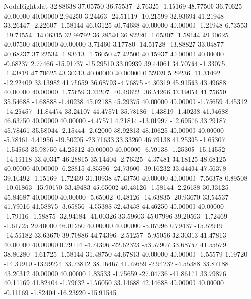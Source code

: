 \begin{filecontents}{NodeRight.dat}
  32.88638   37.05750   36.75537    -2.76325   -1.15169   48.77500   36.70625   40.00000   40.00000    2.94250    3.24463  -24.51119  -10.21599
  32.93694   41.21948   33.26447    -2.22607   -1.58144   46.03125   40.74688   40.00000   40.00000   -1.21948    6.73553  -19.79554  -14.06315
  32.99792   36.28540   36.82220    -1.65307   -1.58144   49.60625   40.07500   40.00000   40.00000    3.71460    3.17780  -14.51728  -13.88827
  33.04877   40.68237   37.22534    -1.83213   -1.76050   47.42500   40.15937   40.00000   40.00000   -0.68237    2.77466  -15.91737  -15.29510
  33.09939   39.44061   34.70764    -1.33075   -1.43819   47.70625   43.30313   40.00000   40.00000    0.55939    5.29236  -11.31092  -12.22409
  33.13982   41.75659   36.68793    -4.76875   -4.30319   45.91563   43.49688   40.00000   40.00000   -1.75659    3.31207  -40.49622  -36.54266
  33.19054   41.75659   35.54688    -1.68888   -1.40238   45.02188   45.29375   40.00000   40.00000   -1.75659    4.45312  -14.26457  -11.84474
  33.24107   44.47571   35.78186    -1.43819   -1.40238   41.94688   46.63750   40.00000   40.00000   -4.47571    4.21814  -13.01997  -12.69576
  33.29187   45.78461   35.58044    -2.15444   -2.62000   38.92813   48.10625   40.00000   40.00000   -5.78461    4.41956  -19.50205  -23.71633
  33.33260   46.79138   41.25305    -1.65307   -1.54563   35.98750   44.25312   40.00000   40.00000   -6.79138   -1.25305  -15.14552  -14.16118
  33.40347   46.28815   35.14404    -2.76325   -4.37481   34.18125   48.68125   40.00000   40.00000   -6.28815    4.85596  -24.73600  -39.16232
  33.44404   47.56378   39.10492    -1.15169   -1.72469   31.10938   47.43750   40.00000   40.00000   -7.56378    0.89508  -10.61863  -15.90170
  33.49483   45.65002   40.48126    -1.58144   -2.26188   30.33125   45.84687   40.00000   40.00000   -5.65002   -0.48126  -14.63835  -20.93670
  33.54537   41.79016   41.58875    -3.65856   -4.55388   32.43438   44.46250   40.00000   40.00000   -1.79016   -1.58875  -32.94184  -41.00326
  33.59603   45.07996   39.20563    -1.72469   -1.61725   29.40000   46.01250   40.00000   40.00000   -5.07996    0.79437  -15.52919  -14.56182
  33.63670   39.70886   44.74396    -2.51257   -5.95056   32.30313   41.47813   40.00000   40.00000    0.29114   -4.74396  -22.62323  -53.57907
  33.68757   41.55579   38.80280    -1.61725   -1.58144   31.48750   44.67813   40.00000   40.00000   -1.55579    1.19720  -14.30910  -13.99224
  33.73812   38.16467   41.75659    -2.94232   -4.55388   33.87188   43.20312   40.00000   40.00000    1.83533   -1.75659  -27.04736  -41.86171
  33.79876   40.11169   41.82404    -1.79632   -1.76050   33.14688   42.14688   40.00000   40.00000   -0.11169   -1.82404  -16.23920  -15.91545

\end{filecontents}

